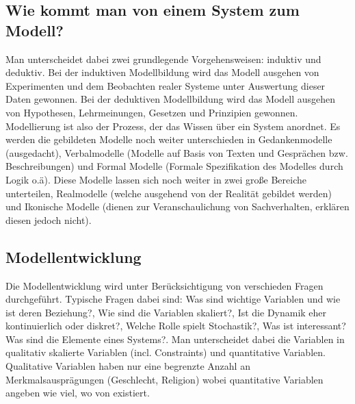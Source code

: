 \documentclass[11pt, fleqn, a4paper, leqno]{scrartcl} %
\begin{document}
	\subsection{Wie kommt man von einem System zum Modell?}
		Man unterscheidet dabei zwei grundlegende Vorgehensweisen: induktiv und deduktiv. Bei der induktiven Modellbildung wird das Modell ausgehen von Experimenten und dem Beobachten realer Systeme unter Auswertung dieser Daten gewonnen. Bei der deduktiven Modellbildung wird das Modell ausgehen von Hypothesen, Lehrmeinungen, Gesetzen und Prinzipien gewonnen. Modellierung ist also der Prozess, der das Wissen über ein System anordnet. Es werden die gebildeten Modelle noch weiter unterschieden in Gedankenmodelle (ausgedacht), Verbalmodelle (Modelle auf Basis von Texten und Gesprächen bzw. Beschreibungen) und Formal Modelle (Formale Spezifikation des Modelles durch Logik o.ä). Diese Modelle lassen sich noch weiter in zwei große Bereiche unterteilen, Realmodelle (welche ausgehend von der Realität gebildet werden) und Ikonische Modelle (dienen zur Veranschaulichung von Sachverhalten, erklären diesen jedoch nicht).
	\subsection{Modellentwicklung}
		Die Modellentwicklung wird unter Berücksichtigung von verschieden Fragen durchgeführt. Typische Fragen dabei sind: Was sind wichtige Variablen und wie ist deren Beziehung?, Wie sind die Variablen skaliert?, Ist die Dynamik eher kontinuierlich oder diskret?, Welche Rolle spielt Stochastik?, Was ist interessant? Was sind die Elemente eines Systems?. Man unterscheidet dabei die Variablen in qualitativ skalierte Variablen (incl. Constraints) und quantitative Variablen. Qualitative Variablen haben nur eine begrenzte Anzahl an Merkmalsausprägungen (Geschlecht, Religion) wobei quantitative Variablen angeben wie viel, wo von existiert.
\end{document}
